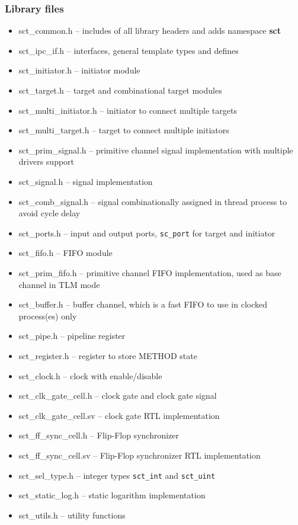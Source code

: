 \subsubsection{Library files}

\begin{itemize}
\item sct\_common.h -- includes of all library headers and adds namespace \textbf{sct}
\item sct\_ipc\_if.h -- interfaces, general template types and defines
\item sct\_initiator.h -- initiator module
\item sct\_target.h -- target and combinational target modules
\item sct\_multi\_initiator.h -- initiator to connect multiple targets
\item sct\_multi\_target.h -- target to connect multiple initiators
\item sct\_prim\_signal.h -- primitive channel signal implementation with multiple drivers support
\item sct\_signal.h -- signal implementation
\item sct\_comb\_signal.h -- signal combinationally assigned in thread process to avoid cycle delay
\item sct\_ports.h -- input and output ports, {\tt sc\_port} for target and initiator
\item sct\_fifo.h -- FIFO module
\item sct\_prim\_fifo.h -- primitive channel FIFO implementation, used as base channel in TLM mode
\item sct\_buffer.h -- buffer channel, which is a fast FIFO to use in clocked process(es) only
\item sct\_pipe.h -- pipeline register
\item sct\_register.h -- register to store METHOD state
\item sct\_clock.h -- clock with enable/disable
\item sct\_clk\_gate\_cell.h -- clock gate and clock gate signal
\item sct\_clk\_gate\_cell.sv -- clock gate RTL implementation
\item sct\_ff\_sync\_cell.h -- Flip-Flop synchronizer
\item sct\_ff\_sync\_cell.sv -- Flip-Flop synchronizer RTL implementation
\item sct\_sel\_type.h -- integer types {\tt sct\_int} and {\tt sct\_uint}
\item sct\_static\_log.h -- static logarithm implementation
\item sct\_utils.h -- utility functions
\end{itemize}

